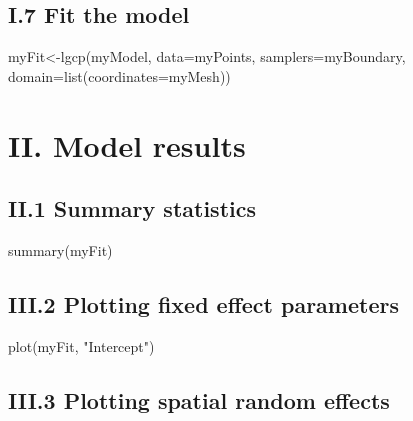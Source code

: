 \documentclass[
]{article}
\newenvironment{Shaded}{\begin{snugshade}}{\end{snugshade}}
\newcommand{\AttributeTok}[1]{\textcolor[rgb]{0.77,0.63,0.00}{#1}}
\newcommand{\FunctionTok}[1]{\textcolor[rgb]{0.00,0.00,0.00}{#1}}
\newcommand{\NormalTok}[1]{#1}
\newcommand{\OtherTok}[1]{\textcolor[rgb]{0.56,0.35,0.01}{#1}}
\newcommand{\StringTok}[1]{\textcolor[rgb]{0.31,0.60,0.02}{#1}}
\begin{document}
\hypertarget{i.7-fit-the-model}{%
\subsection{I.7 Fit the model}\label{i.7-fit-the-model}}

\begin{Shaded}
\begin{Highlighting}[]
\NormalTok{myFit}\OtherTok{\textless{}{-}}\FunctionTok{lgcp}\NormalTok{(myModel, }\AttributeTok{data=}\NormalTok{myPoints, }\AttributeTok{samplers=}\NormalTok{myBoundary, }\AttributeTok{domain=}\FunctionTok{list}\NormalTok{(}\AttributeTok{coordinates=}\NormalTok{myMesh))}
\end{Highlighting}
\end{Shaded}

\hypertarget{ii.-model-results}{%
\section{II. Model results}\label{ii.-model-results}}

\hypertarget{ii.1-summary-statistics}{%
\subsection{II.1 Summary statistics}\label{ii.1-summary-statistics}}

\begin{Shaded}
\begin{Highlighting}[]
\FunctionTok{summary}\NormalTok{(myFit)}
\end{Highlighting}
\end{Shaded}

\hypertarget{iii.2-plotting-fixed-effect-parameters}{%
\subsection{III.2 Plotting fixed effect
parameters}\label{iii.2-plotting-fixed-effect-parameters}}

\begin{Shaded}
\begin{Highlighting}[]
\FunctionTok{plot}\NormalTok{(myFit, }\StringTok{"Intercept"}\NormalTok{)}
\end{Highlighting}
\end{Shaded}

\hypertarget{iii.3-plotting-spatial-random-effects}{%
\subsection{III.3 Plotting spatial random
effects}\label{iii.3-plotting-spatial-random-effects}}
\end{document}
